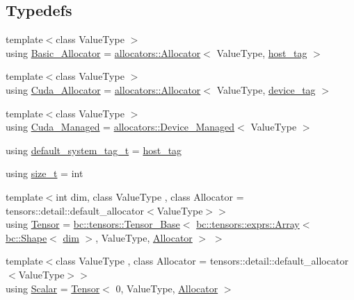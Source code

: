 \subsection*{Typedefs}
\begin{DoxyCompactItemize}
\item 
{\footnotesize template$<$class Value\+Type $>$ }\\using \hyperlink{namespacebc_a08df4c65689bdb7481f0d2d54315e8a6}{Basic\+\_\+\+Allocator} = \hyperlink{classbc_1_1allocators_1_1Allocator}{allocators\+::\+Allocator}$<$ Value\+Type, \hyperlink{structbc_1_1host__tag}{host\+\_\+tag} $>$
\item 
{\footnotesize template$<$class Value\+Type $>$ }\\using \hyperlink{namespacebc_a00a6f4634cf1568da58d6b30b25b2b7c}{Cuda\+\_\+\+Allocator} = \hyperlink{classbc_1_1allocators_1_1Allocator}{allocators\+::\+Allocator}$<$ Value\+Type, \hyperlink{structbc_1_1device__tag}{device\+\_\+tag} $>$
\item 
{\footnotesize template$<$class Value\+Type $>$ }\\using \hyperlink{namespacebc_a1a27e2aeebe3c61abedd8fe9874a6ea8}{Cuda\+\_\+\+Managed} = \hyperlink{structbc_1_1allocators_1_1Device__Managed}{allocators\+::\+Device\+\_\+\+Managed}$<$ Value\+Type $>$
\item 
using \hyperlink{namespacebc_afc523ebfb2766ca065901d60e7f58ede}{default\+\_\+system\+\_\+tag\+\_\+t} = \hyperlink{structbc_1_1host__tag}{host\+\_\+tag}
\item 
using \hyperlink{namespacebc_aaf8e3fbf99b04b1b57c4f80c6f55d3c5}{size\+\_\+t} = int
\item 
{\footnotesize template$<$int dim, class Value\+Type , class Allocator  = tensors\+::detail\+::default\+\_\+allocator$<$\+Value\+Type$>$$>$ }\\using \hyperlink{namespacebc_a659391e47ab612be3ba6c18cf9c89159}{Tensor} = \hyperlink{classbc_1_1tensors_1_1Tensor__Base}{bc\+::tensors\+::\+Tensor\+\_\+\+Base}$<$ \hyperlink{structbc_1_1tensors_1_1exprs_1_1Array}{bc\+::tensors\+::exprs\+::\+Array}$<$ \hyperlink{structbc_1_1Shape}{bc\+::\+Shape}$<$ \hyperlink{namespacebc_a28c12b5b6f9955c77a8c4b0cf047cfb6}{dim} $>$, Value\+Type, \hyperlink{classbc_1_1allocators_1_1Allocator}{Allocator} $>$ $>$
\item 
{\footnotesize template$<$class Value\+Type , class Allocator  = tensors\+::detail\+::default\+\_\+allocator$<$\+Value\+Type$>$$>$ }\\using \hyperlink{namespacebc_aa12ac55ee2c43dc082894dd3859daee1}{Scalar} = \hyperlink{namespacebc_a659391e47ab612be3ba6c18cf9c89159}{Tensor}$<$ 0, Value\+Type, \hyperlink{classbc_1_1allocators_1_1Allocator}{Allocator} $>$

\end{DoxyCompactItemize}

